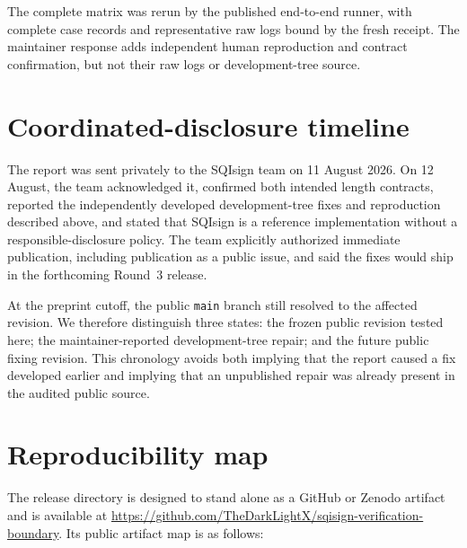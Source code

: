 \documentclass[11pt]{article}
\newcommand{\code}[1]{\texttt{#1}}
\begin{document}
The complete matrix was rerun by the published end-to-end runner, with complete
case records and representative raw logs bound by the fresh receipt.  The
maintainer response adds independent human reproduction and contract
confirmation, but not their raw logs or development-tree source.

\section{Coordinated-disclosure timeline}

The report was sent privately to the SQIsign team on 11 August 2026.  On
12 August, the team acknowledged it, confirmed both intended length contracts,
reported the independently developed development-tree fixes and reproduction
described above, and stated that SQIsign is a reference implementation without
a responsible-disclosure policy.  The team explicitly authorized immediate
publication, including publication as a public issue, and said the fixes would
ship in the forthcoming Round~3 release.

At the preprint cutoff, the public \code{main} branch still resolved to the
affected revision.  We therefore distinguish three states: the frozen public
revision tested here; the maintainer-reported development-tree repair; and the
future public fixing revision.  This chronology avoids both implying that the
report caused a fix developed earlier and implying that an unpublished repair
was already present in the audited public source.

\section{Reproducibility map}

The release directory is designed to stand alone as a GitHub or Zenodo
artifact and is available at
\url{https://github.com/TheDarkLightX/sqisign-verification-boundary}.
Its public artifact map is as follows:
\end{document}
